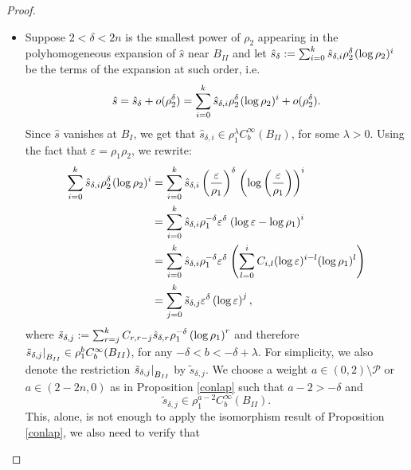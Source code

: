 \documentclass[a4paper,11pt]{article}
\newcommand\restr[2]{{%
  \left.\kern-\nulldelimiterspace %
  #1 %
  \littletaller %
  \right|_{#2} %
  }}
\newcommand{\littletaller}{\mathchoice{\vphantom{\big|}}{}{}{}}
\begin{document}
\begin{proof}
    \begin{itemize}
        \item Suppose $2< \delta < 2n$ is the smallest power of $\rho_2$ appearing in the polyhomogeneous expansion of $\hat s$ near $B_{II}$ and let $ \hat s_\delta :=  \sum_{i=0}^k \hat s_{\delta, i} \rho_2^{\delta}\hspace{0.03cm}(\log \rho_2)^i$ be the terms of the expansion at such order, i.e.
        $$
        \hat s = \hat s_\delta + o(\rho_2^\delta) =   \sum_{i=0}^k \hat s_{\delta, i} \rho_2^{\delta}\hspace{0.03cm}(\log \rho_2)^i + o(\rho_2^\delta).
        $$
Since $\hat s$ vanishes at $B_{I}$, we get that $\hat s_{\delta, i} \in \rho_1^{\lambda}C_b^\infty (B_{II})$, for some $\lambda >0$. Using the fact that $\varepsilon = \rho_1 \rho_2$, we rewrite: 
        \begin{align*}
        \sum_{i=0}^k \hat s_{\delta, i} \rho_2^{\delta}\hspace{0.03cm}(\log \rho_2)^i & = \sum_{i=0}^k \hat s_{\delta, i} \left(\frac{\varepsilon}{\rho_1}\right)^{\delta}\hspace{0.03cm} \left(\log \left(\frac{\varepsilon}{\rho_1}\right) \right)^i \\ & = \sum_{i=0}^k \hat  s_{\delta, i} \rho_1^{- \delta} \varepsilon^{\delta}\hspace{0.03cm} \left(\log \varepsilon  - \log \rho_1 \right)^i \\ & =\sum_{i=0}^k \hat s_{\delta, i} \rho_1^{- \delta} \varepsilon^{\delta}\hspace{0.03cm}  \left( \sum_{l=0}^i C_{i,l} (\log \varepsilon)^{i-l} (\log \rho_1)^{l} \right) \\ & = \sum_{j=0}^{k} \tilde s_{\delta, j} \varepsilon^{\delta}  \left(\log \varepsilon \right)^j,
         \end{align*}
         where $\tilde s_{\delta, j} := \sum_{r=j}^{k} C_{r,r-j} \hat s_{\delta, r} \hspace{0.02cm}\rho_1^{- \delta} \left( \log \rho_1 \right)^r$ and therefore $\restr{\tilde s_{\delta, j}}{B_{II}} \in \rho_1^{b} C_b^\infty(B_{II})$, for any $- \delta < b < - \delta + \lambda$. For simplicity, we also denote the restriction $\restr{\tilde s_{\delta, j}}{B_{II}}$ by $\tilde s_{\delta, j}$. We choose a weight $ a \in (0,2) \setminus \mathcal{P}$ or $ a \in (2-2n,0) $ as in Proposition \ref{conlap} such that $a -2  > - \delta $ and 
    $$
    \tilde s_{\delta,j} \in \rho_1^{a-2} C_b^{\infty}(B_{II}).
    $$
    This, alone, is not enough to apply the isomorphism result of Proposition \ref{conlap}, we also need to verify that

\end{itemize}
\end{proof}
\end{document}

